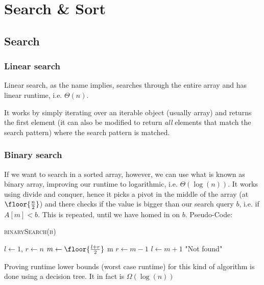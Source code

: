 \newsection
\section{Search \& Sort}
\subsection{Search}
\subsubsection{Linear search}
Linear search, as the name implies, searches through the entire array and has linear runtime, i.e. $\Theta(n)$. 

It works by simply iterating over an iterable object (usually array) and returns the first element (it can also be modified to return \textit{all} elements that match the search pattern) where the search pattern is matched.


\subsubsection{Binary search}
If we want to search in a sorted array, however, we can use what is known as binary array, improving our runtime to logarithmic, i.e. $\Theta(\log(n))$.
It works using divide and conquer, hence it picks a pivot in the middle of the array (at $\floor{\frac{n}{2}}$) and there checks if the value is bigger than our search query $b$, i.e. if $A[m] < b$. This is repeated, until we have homed in on $b$. Pseudo-Code:

\begin{algorithm}
    \begin{spacing}{1.2}
        \caption{\textsc{binarySearch(b)}}
        \begin{algorithmic}[1]
            \State $l \gets 1$, $r \gets n$ 
                \State $m \gets \floor{\frac{l + r}{2}}$
                 \Return m 
                 $r \gets m - 1$ 
                \Else \hspace{0.2em} $l \gets m + 1$ 
                \EndIf
            \EndWhile
            \State \Return "Not found"
        \end{algorithmic}
    \end{spacing}
\end{algorithm}

Proving runtime lower bounds (worst case runtime) for this kind of algorithm is done using a decision tree. It in fact is $\Omega(\log(n))$

